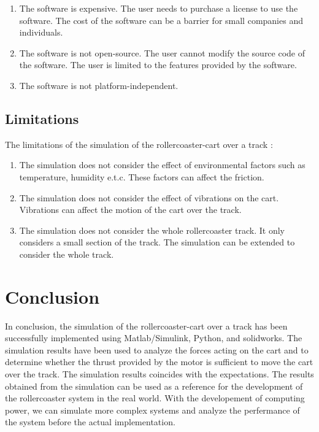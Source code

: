 \documentclass{article}
\begin{document}
\begin{enumerate}
\begin{enumerate}
                \item The software is expensive. The user needs to purchase a
                    license to use the software. The cost of the software can be
                    a barrier for small companies and individuals.

                \item The software is not open-source. The user cannot modify
                    the source code of the software. The user is limited to the features
                    provided by the software.

                \item The software is not platform-independent.
            \end{enumerate}
    \end{enumerate}

    \subsection{Limitations}
    The limitations of the simulation of the rollercoaster-cart over a track :
    \begin{enumerate}
        \item The simulation does not consider the effect of environmental factors
            such as temperature, humidity e.t.c. These factors can affect the friction.

        \item The simulation does not consider the effect of vibrations on the cart.
            Vibrations can affect the motion of the cart over the track.

        \item The simulation does not consider the whole rollercoaster track. It
            only considers a small section of the track. The simulation can be extended
            to consider the whole track.
    \end{enumerate}
    \section{Conclusion}
    In conclusion, the simulation of the rollercoaster-cart over a track has been
    successfully implemented using Matlab/Simulink, Python, and solidworks. The
    simulation results have been used to analyze the forces acting on the cart
    and to determine whether the thrust provided by the motor is sufficient to
    move the cart over the track. The simulation results coincides with the expectations.
    The results obtained from the simulation can be used as a reference for the
    development of the rollercoaster system in the real world. With the developement
    of computing power, we can simulate more complex systems and analyze the
    perfermance of the system before the actual implementation.
\end{document}
